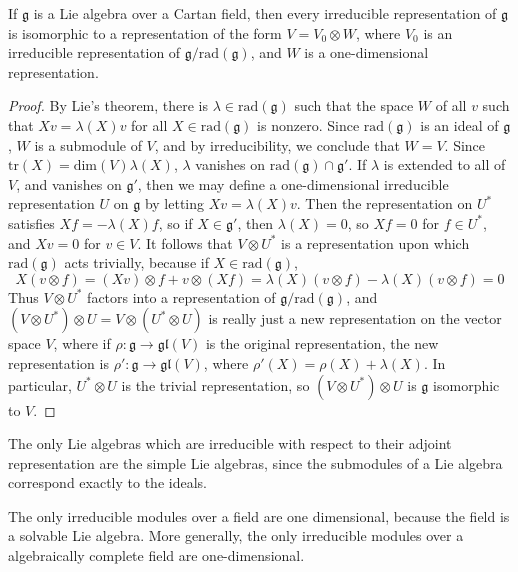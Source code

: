 \begin{theorem}
    If $\mathfrak{g}$ is a Lie algebra over a Cartan field, then every irreducible representation of $\mathfrak{g}$ is isomorphic to a representation of the form $V = V_0 \otimes W$, where $V_0$ is an irreducible representation of $\mathfrak{g}/\text{rad}(\mathfrak{g})$, and $W$ is a one-dimensional representation.
\end{theorem}
\begin{proof}
    By Lie's theorem, there is $\lambda \in \text{rad}(\mathfrak{g})$ such that the space $W$ of all $v$ such that $Xv = \lambda(X)v$ for all $X \in \text{rad}(\mathfrak{g})$ is nonzero. Since $\text{rad}(\mathfrak{g})$ is an ideal of $\mathfrak{g}$, $W$ is a submodule of $V$, and by irreducibility, we conclude that $W = V$. Since $\text{tr}(X) = \text{dim}(V) \lambda(X)$, $\lambda$ vanishes on $\text{rad}(\mathfrak{g}) \cap \mathfrak{g}'$. If $\lambda$ is extended to all of $V$, and vanishes on $\mathfrak{g}'$, then we may define a one-dimensional irreducible representation $U$ on $\mathfrak{g}$ by letting $Xv = \lambda(X)v$. Then the representation on $U^*$ satisfies $Xf = - \lambda(X) f$, so if $X \in \mathfrak{g}'$, then $\lambda(X) = 0$, so $Xf = 0$ for $f \in U^*$, and $Xv = 0$ for $v \in V$. It follows that $V \otimes U^*$ is a representation upon which $\text{rad}(\mathfrak{g})$ acts trivially, because if $X \in \text{rad}(\mathfrak{g})$,
    \[ X(v \otimes f) = (Xv) \otimes f + v \otimes (Xf) = \lambda(X) (v \otimes f) - \lambda(X) (v \otimes f) = 0 \]
    Thus $V \otimes U^*$ factors into a representation of $\mathfrak{g}/\text{rad}(\mathfrak{g})$, and $(V \otimes U^*) \otimes U = V \otimes (U^* \otimes U)$ is really just a new representation on the vector space $V$, where if $\rho: \mathfrak{g} \to \mathfrak{gl}(V)$ is the original representation, the new representation is $\rho': \mathfrak{g} \to \mathfrak{gl}(V)$, where $\rho'(X) = \rho(X) + \lambda(X)$. In particular, $U^* \otimes U$ is the trivial representation, so $(V \otimes U^*) \otimes U$ is $\mathfrak{g}$ isomorphic to $V$.
\end{proof}

\begin{example}
    The only Lie algebras which are irreducible with respect to their adjoint representation are the simple Lie algebras, since the submodules of a Lie algebra correspond exactly to the ideals.
\end{example}

\begin{example}
    The only irreducible modules over a field are one dimensional, because the field is a solvable Lie algebra. More generally, the only irreducible modules over a algebraically complete field are one-dimensional.
\end{example}

